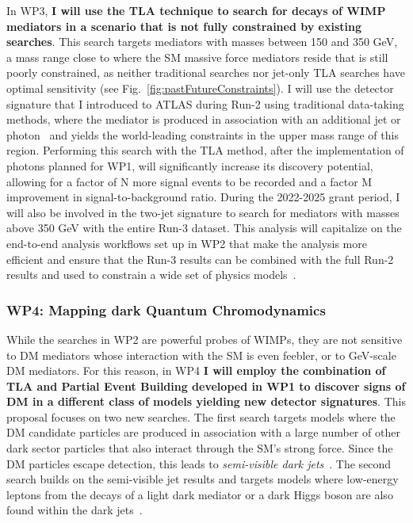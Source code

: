 \documentclass[11pt,a4paper]{article}
\begin{document}
In WP3, \textbf{I will use the TLA technique to search for decays of WIMP mediators in a scenario that is not fully constrained by existing searches}.
This search targets mediators with masses between 150 and 350 GeV, a mass range close to where the SM massive force mediators reside that is still poorly constrained, as neither traditional searches nor jet-only TLA searches have optimal sensitivity (see Fig.~\ref{fig:pastFutureConstraints}).  
I will use the detector signature that I introduced to ATLAS during Run-2 using traditional data-taking methods, where the mediator is produced in association with an additional jet or photon~\cite{DijetISR} and yields the world-leading constraints in the upper mass range of this region. 
Performing this search with the TLA method, after the implementation of photons planned for WP1, will significantly increase its discovery potential, 
allowing for a factor of \color{red}N \color{black} more signal events to be recorded and a factor \color{red}M \color{black} improvement in signal-to-background ratio. 
During the 2022-2025 grant period, I will also be involved in the two-jet signature to search for mediators with masses above 350 GeV with the entire Run-3 dataset.
This analysis will capitalize on the end-to-end analysis workflows set up in WP2 that make the analysis more efficient and ensure that the Run-3 results can be combined with the full Run-2 results and used to constrain a wide set of physics models~\cite{Resonances}.   

\subsubsection*{WP4: Mapping dark Quantum Chromodynamics}

While the searches in WP2 are powerful probes of WIMPs, they are not sensitive to DM mediators whose interaction with the SM is even feebler, or to GeV-scale DM mediators.
For this reason, in WP4 \textbf
{I will employ the combination of TLA and Partial Event Building developed in WP1 to discover signs of DM in a different class of models yielding new detector signatures}. 
This proposal focuses on two new searches.  
The first search targets models where the DM candidate particles are produced in association with a large number of other dark sector particles
that also interact through the SM's strong force. Since the DM particles escape detection, this leads to \textit{semi-visible dark jets}~\cite{NewScenario}.
The second search builds on the semi-visible jet results and targets models where low-energy leptons from the decays of a light dark mediator or a dark Higgs boson are also found within the dark jets~\cite{HAHM,FWRZ,Prestel?}.
\end{document}
